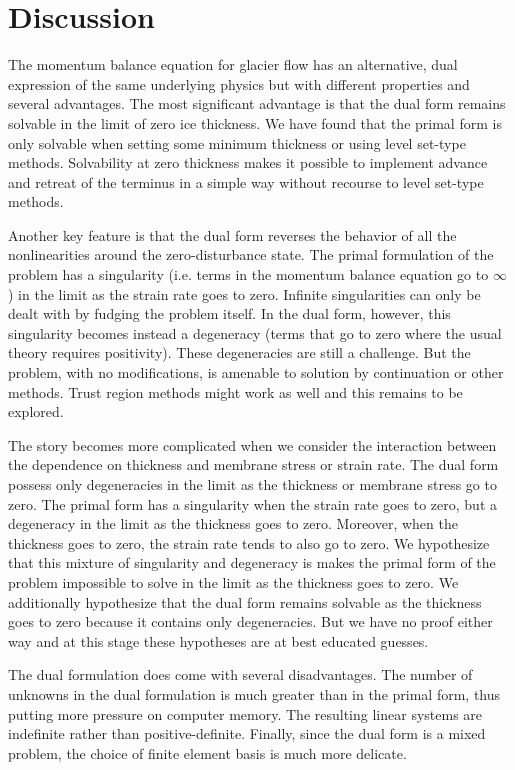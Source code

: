 \documentclass{article}
\theoremstyle{definition}
\theoremstyle{plain}
\begin{document}
\section{Discussion}

The momentum balance equation for glacier flow has an alternative, dual expression of the same underlying physics but with different properties and several advantages.
The most significant advantage is that the dual form remains solvable in the limit of zero ice thickness.
We have found that the primal form is only solvable when setting some minimum thickness or using level set-type methods.
Solvability at zero thickness makes it possible to implement advance and retreat of the terminus in a simple way without recourse to level set-type methods.

Another key feature is that the dual form reverses the behavior of all the nonlinearities around the zero-disturbance state.
The primal formulation of the problem has a singularity (i.e. terms in the momentum balance equation go to $\infty$) in the limit as the strain rate goes to zero.
Infinite singularities can only be dealt with by fudging the problem itself.
In the dual form, however, this singularity becomes instead a degeneracy (terms that go to zero where the usual theory requires positivity).
These degeneracies are still a challenge.
But the problem, with no modifications, is amenable to solution by continuation or other methods.
Trust region methods might work as well and this remains to be explored.

The story becomes more complicated when we consider the interaction between the dependence on thickness and membrane stress or strain rate.
The dual form possess only degeneracies in the limit as the thickness or membrane stress go to zero.
The primal form has a singularity when the strain rate goes to zero, but a degeneracy in the limit as the thickness goes to zero.
Moreover, when the thickness goes to zero, the strain rate tends to also go to zero.
We hypothesize that this mixture of singularity and degeneracy is makes the primal form of the problem impossible to solve in the limit as the thickness goes to zero.
We additionally hypothesize that the dual form remains solvable as the thickness goes to zero because it contains only degeneracies.
But we have no proof either way and at this stage these hypotheses are at best educated guesses.

The dual formulation does come with several disadvantages.
The number of unknowns in the dual formulation is much greater than in the primal form, thus putting more pressure on computer memory.
The resulting linear systems are indefinite rather than positive-definite.
Finally, since the dual form is a mixed problem, the choice of finite element basis is much more delicate.
\end{document}
